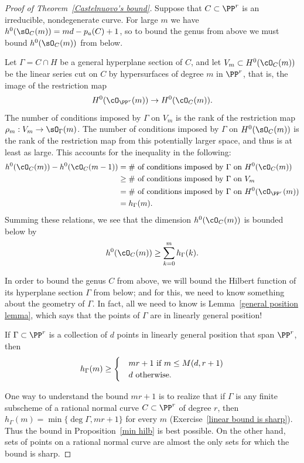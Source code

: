\begin{proof}[Proof of Theorem~\ref{Castelnuovo's bound}]
Suppose that $C \subset \PP^r$ is an irreducible, nondegenerate curve. For large $m$ we have
$h^{0}(\sO_{C}(m)) = md-p_{a}(C) +1$, so to bound the genus from above we must
bound $h^{0}(\sO_{C}(m))$ from below.

Let $\Gamma = C \cap H$ be a general hyperplane section of $C$, and let $V_m \subset H^0(\cO_C(m))$ be the linear series cut on $C$ by hypersurfaces of degree $m$ in $\PP^r$, that is, the image of the restriction map
$$
H^0(\cO_{\PP^r}(m)) \to H^0(\cO_C(m)).
$$
The number of  conditions imposed by $\Gamma$ on $V_m$ is the rank of the restriction map 
$\rho_m: V_m \to \sO_\Gamma(m)$. 
 The number of conditions imposed by $\Gamma$ on $H^{0}(\sO_{C}(m))$ is the 
 rank of the restriction map from this potentially larger space, and thus is at least as large. This 
 accounts for the inequality in the following:
\begin{align*}
h^0(\cO_C(m)) - h^0(\cO_C(m-1)) & = \text{\# of conditions imposed by $\Gamma$ on $H^0(\cO_C(m))$}\\
&\geq \text{\# of conditions imposed by $\Gamma$ on $V_m$} \\
&= \text{\# of conditions imposed by $\Gamma$ on $H^0(\cO_{\PP^r}(m))$} \\
&= h_\Gamma(m).
\end{align*}
Summing these relations, we see that the dimension $h^0(\cO_C(m))$ is bounded below by
$$
h^0(\cO_C(m)) \geq \sum_{k=0}^m h_\Gamma(k).
$$

In order to bound the genus $C$ from above, we will bound the Hilbert function of its hyperplane section $\Gamma$  from below; and for this, we need to know something about the geometry of $\Gamma$. In fact, all we need to know is Lemma~\ref{general position lemma}, which says that the points of $\Gamma$ are in linearly general position! 

\begin{proposition}\label{min hilb}
If $\Gamma \subset \PP^r$ is a collection of $d$ points in linearly general position that span $\PP^r$, then 
$$
h_\Gamma(m) \geq 
\begin{cases}
&mr+1\hbox{ if $m\leq M(d,r+1)$}\\
&d \hbox{ otherwise.}
\end{cases}
$$
\end{proposition}

One way to understand the bound $mr+1$ is to realize that if $\Gamma$ is any finite subscheme of a rational normal curve $C\subset\PP^r$ of degree $r$, 
then $h_\Gamma(m) = \min\{\deg \Gamma, mr+1\}$ for every $m$ (Exercise~\ref{linear bound is sharp}).
  Thus the bound in Proposition~\ref{min hilb} is best possible.
On the other hand, sets of points on a rational normal curve are almost the only sets for which the bound is sharp.


\end{proof}
